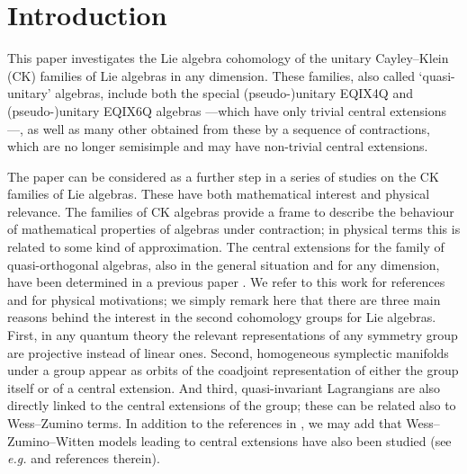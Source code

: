 \section{Introduction}

This paper investigates the Lie algebra cohomology of the unitary
Cayley--Klein (CK) families of Lie algebras
in any dimension.  These families, also called `quasi-unitary' algebras,
include both the special \mbox{(pseudo-)}unitary
EQIX4Q and \mbox{(pseudo-)}uni\-tary EQIX6Q algebras
---which have only trivial central
extensions\mbox{---,} as well as many other obtained from these  by a sequence
of contractions, which are no longer semisimple and may have
non-trivial central extensions.

The paper can be considered as a further step in a
series of studies on the CK families of Lie algebras. These
have both
mathematical interest and physical relevance. The families of CK
algebras provide a frame to describe the behaviour of mathematical
properties of algebras under contraction; in physical terms this is related to
some kind of approximation. The central extensions for the family of
quasi-orthogonal  algebras, also in the general situation and for any
dimension, have been determined in a previous paper \cite{Azc.Her.Bue.San:96}.
We refer to this work for references and for physical
motivations; we simply remark here that there are three main reasons behind the
interest in the second cohomology groups for Lie algebras. First, in any
quantum theory the relevant representations of any symmetry group are
projective instead of linear ones. Second, homogeneous symplectic manifolds
under a group appear as orbits of the coadjoint representation of either the
group itself or of a central extension. And third, quasi-invariant Lagrangians
are also directly linked to the central extensions of the group; these can be
related also to Wess--Zumino terms. In
addition to the references in
\cite{Azc.Her.Bue.San:96}, we may add that Wess--Zumino--Witten models leading
to central extensions have also been studied
(see \emph{e.g.}
\cite{Azc.Izq.Mac:90,Fig.Sta:94} and references therein).

